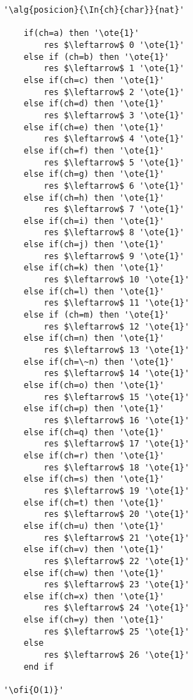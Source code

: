 \begin{lstlisting}[mathescape]
'\alg{posicion}{\In{ch}{char}}{nat}'

	if(ch=a) then '\ote{1}'
		res $\leftarrow$ 0 '\ote{1}'
	else if (ch=b) then '\ote{1}'
		res $\leftarrow$ 1 '\ote{1}'
	else if(ch=c) then '\ote{1}'
		res $\leftarrow$ 2 '\ote{1}'
	else if(ch=d) then '\ote{1}'
		res $\leftarrow$ 3 '\ote{1}'
	else if(ch=e) then '\ote{1}'
		res $\leftarrow$ 4 '\ote{1}'
	else if(ch=f) then '\ote{1}'
		res $\leftarrow$ 5 '\ote{1}'
	else if(ch=g) then '\ote{1}'
		res $\leftarrow$ 6 '\ote{1}'
	else if(ch=h) then '\ote{1}'
		res $\leftarrow$ 7 '\ote{1}'
	else if(ch=i) then '\ote{1}'
		res $\leftarrow$ 8 '\ote{1}'
	else if(ch=j) then '\ote{1}'
		res $\leftarrow$ 9 '\ote{1}'
	else if(ch=k) then '\ote{1}'
		res $\leftarrow$ 10 '\ote{1}'
	else if(ch=l) then '\ote{1}'
		res $\leftarrow$ 11 '\ote{1}'
	else if (ch=m) then '\ote{1}'
		res $\leftarrow$ 12 '\ote{1}'
	else if(ch=n) then '\ote{1}'
		res $\leftarrow$ 13 '\ote{1}'
	else if(ch=\~n) then '\ote{1}'
		res $\leftarrow$ 14 '\ote{1}'
	else if(ch=o) then '\ote{1}'
		res $\leftarrow$ 15 '\ote{1}'
	else if(ch=p) then '\ote{1}'
		res $\leftarrow$ 16 '\ote{1}'
	else if(ch=q) then '\ote{1}'
		res $\leftarrow$ 17 '\ote{1}'
	else if(ch=r) then '\ote{1}'
		res $\leftarrow$ 18 '\ote{1}'
	else if(ch=s) then '\ote{1}'
		res $\leftarrow$ 19 '\ote{1}'
    else if(ch=t) then '\ote{1}'
		res $\leftarrow$ 20 '\ote{1}'
    else if(ch=u) then '\ote{1}'
		res $\leftarrow$ 21 '\ote{1}'
    else if(ch=v) then '\ote{1}'
		res $\leftarrow$ 22 '\ote{1}'
	else if(ch=w) then '\ote{1}'
		res $\leftarrow$ 23 '\ote{1}'
	else if(ch=x) then '\ote{1}'
		res $\leftarrow$ 24 '\ote{1}'
    else if(ch=y) then '\ote{1}'
		res $\leftarrow$ 25 '\ote{1}'
	else
		res $\leftarrow$ 26 '\ote{1}'
	end if

'\ofi{O(1)}'

\end{lstlisting}